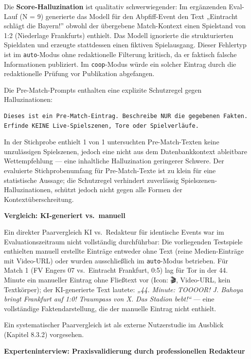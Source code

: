 Die \textbf{Score-Halluzination} ist qualitativ schwerwiegender: Im
ergänzenden Eval-Lauf (N = 9) generierte das Modell für den
Abpfiff-Event den Text „Eintracht schlägt die Bayern!'' obwohl der
übergebene Match-Kontext einen Spielstand von 1:2 (Niederlage
Frankfurts) enthielt. Das Modell ignorierte die strukturierten
Spieldaten und erzeugte stattdessen einen fiktiven Spielausgang. Dieser
Fehlertyp ist im \passthrough{\lstinline!auto!}-Modus ohne redaktionelle
Filterung kritisch, da er faktisch falsche Informationen publiziert. Im
\passthrough{\lstinline!coop!}-Modus würde ein solcher Eintrag durch die
redaktionelle Prüfung vor Publikation abgefangen.

Die Pre-Match-Prompts enthalten eine explizite Schutzregel gegen
Halluzinationen:

\begin{lstlisting}
Dieses ist ein Pre-Match-Eintrag. Beschreibe NUR die gegebenen Fakten.
Erfinde KEINE Live-Spielszenen, Tore oder Spielverläufe.
\end{lstlisting}

In der Stichprobe enthielt 1 von 1 untersuchten Pre-Match-Texten keine
unzulässigen Spielszenen, jedoch eine nicht aus dem Datenbankkontext
ableitbare Wettempfehlung --- eine inhaltliche Halluzination geringerer
Schwere. Der evaluierte Stichprobenumfang für Pre-Match-Texte ist zu
klein für eine statistische Aussage; die Schutzregel verhindert
zuverlässig Spielszenen-Halluzinationen, schützt jedoch nicht gegen alle
Formen der Kontextüberschreitung.

\textbf{Vergleich: KI-generiert vs.~manuell}

Ein direkter Paarvergleich KI vs.~Redakteur für identische Events war im
Evaluationszeitraum nicht vollständig durchführbar: Die vorliegenden
Testspiele enthielten manuell erstellte Einträge entweder ohne Text
(reine Medien-Einträge mit Video-URL) oder wurden ausschließlich im
\passthrough{\lstinline!auto!}-Modus betrieben. Für Match 1 (FV Engers
07 vs.~Eintracht Frankfurt, 0:5) lag für Tor in der 44. Minute ein
manueller Eintrag ohne Fließtext vor (Icon: 🎬, Video-URL, kein
Textkörper); der KI-generierte Text lautete: \emph{„44. Minute: TOOOOR!
J. Bahoya bringt Frankfurt auf 1:0! Traumpass von X. Das Stadion
bebt!{\kern0pt}``} --- eine vollständige Faktendarstellung, die der
manuelle Eintrag nicht enthielt.

Ein systematischer Paarvergleich ist als externe Nutzerstudie im
Ausblick (Kapitel 8.3.2) vorgesehen.

\textbf{Experteninterview: Praxisvalidierung durch professionellen
Redakteur}

